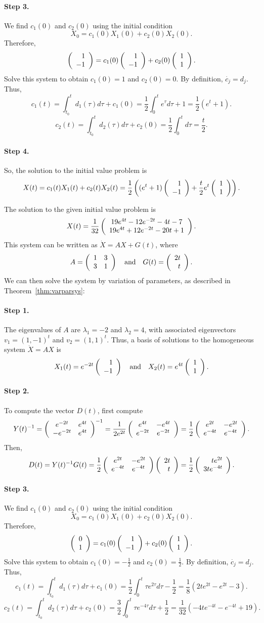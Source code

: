 \documentclass{ximera}
\begin{document}
\paragraph{Step 3.} We find $c_1(0)$ and $c_2(0)$ using the initial
condition
\[
X_0 = c_1(0)X_1(0) + c_2(0)X_2(0).
\]
Therefore,
\[
\left(\begin{array}{r} 1 \\ -1\end{array}\right) = c_1(0)\left(\begin{array}{r} 1 \\ -1\end{array}\right) + c_2(0)\left(\begin{array}{r} 1 \\ 1\end{array}\right).
\]
Solve this system to obtain $c_1(0) = 1$ and $c_2(0) = 0$.  By definition,
$\dot{c_j} = d_j$.  Thus,
\[
c_1(t) = \int_{t_0}^td_1(\tau)d\tau + c_1(0)
= \frac{1}{2}\int_0^te^\tau d\tau + 1 = \frac{1}{2}(e^t + 1).
\]
\[
c_2(t) = \int_{t_0}^td_2(\tau)d\tau + c_2(0)
= \frac{1}{2}\int_0^td\tau = \frac{t}{2}.
\]
\paragraph{Step 4.} So, the solution to the initial value problem is
\[
X(t) = c_1(t)X_1(t) + c_2(t)X_2(t)
= \frac{1}{2}\left((e^t + 1)\left(\begin{array}{r} 1 \\ -1\end{array}\right) + \frac{t}{2}e^t\left(\begin{array}{r} 1 \\ 1\end{array}\right)
\right).
\]

 \ans The solution to the given initial value problem is
\[
X(t) = \frac{1}{32}\left(\begin{array}{c} 19e^{4t} - 12e^{-2t} - 4t - 7 \\ 19e^{4t} + 12e^{-2t} - 20t + 1\end{array}\right).
\]
\soln This system can be written as $\dot{X} = AX + G(t)$, where
\[
A = \left(\begin{array}{rr} 1 & 3\\ 3 &1\end{array}\right) \quad\mbox{and}\quad G(t) = \left(\begin{array}{r} 2t \\ t\end{array}\right).
\]
We can then solve the system by variation of parameters, as described in
Theorem~\ref{thm:varparsys}:

\paragraph{Step 1.} The eigenvalues of $A$ are $\lambda_1 = -2$ and
$\lambda_2 = 4$, with associated eigenvectors $v_1 = (1,-1)^t$ and
$v_2 = (1,1)^t$.  Thus, a basis of solutions to the homogeneous system
$\dot{X} = AX$ is
\[
X_1(t) = e^{-2t}\left(\begin{array}{r} 1 \\ -1\end{array}\right) \quad\mbox{and}\quad X_2(t) = e^{4t}\left(\begin{array}{r} 1 \\ 1\end{array}\right).
\]
\paragraph{Step 2.} To compute the vector $D(t)$, first compute
\[
Y(t)^{-1} = \left(\begin{array}{cc} e^{-2t} & e^{4t}\\ -e^{-2t} &e^{4t}\end{array}\right)^{-1}
= \frac{1}{2e^{2t}}\left(\begin{array}{cc} e^{4t} & -e^{4t}\\ e^{-2t} &e^{-2t}\end{array}\right)
= \frac{1}{2}\left(\begin{array}{cc} e^{2t} & -e^{2t}\\ e^{-4t} &e^{-4t}\end{array}\right).
\]
Then,
\[
D(t) = Y(t)^{-1}G(t) =
\frac{1}{2}\left(\begin{array}{cc} e^{2t} & -e^{2t}\\ e^{-4t} &e^{-4t}\end{array}\right)\left(\begin{array}{r} 2t \\ t\end{array}\right) =
\frac{1}{2}\left(\begin{array}{r} te^{2t} \\ 3te^{-4t}\end{array}\right).
\]
\paragraph{Step 3.} We find $c_1(0)$ and $c_2(0)$ using the initial
condition
\[
X_0 = c_1(0)X_1(0) + c_2(0)X_2(0).
\]
Therefore,
\[
\left(\begin{array}{r} 0 \\ 1\end{array}\right) = c_1(0)\left(\begin{array}{r} 1 \\ -1\end{array}\right) + c_2(0)\left(\begin{array}{r} 1 \\ 1\end{array}\right).
\]
Solve this system to obtain $c_1(0) = -\frac{1}{2}$ and $c_2(0) =
\frac{1}{2}$.  By definition, $\dot{c_j} = d_j$.  Thus,
\[
c_1(t) = \int_{t_0}^td_1(\tau)d\tau + c_1(0)
= \frac{1}{2}\int_0^t \tau e^{2\tau}d\tau - \frac{1}{2}
= \frac{1}{8}(2te^{2t} - e^{2t} - 3).
\]
\[
c_2(t) = \int_{t_0}^td_2(\tau)d\tau + c_2(0)
= \frac{3}{2}\int_0^t \tau e^{-4\tau}d\tau + \frac{1}{2}
= \frac{1}{32}(-4te^{-4t} - e^{-4t} + 19).
\]
\newpage
\end{document}
